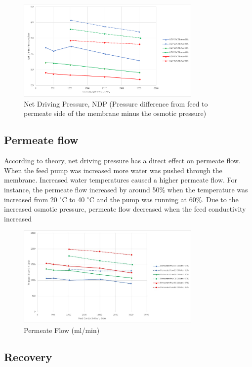 \begin{figure}[H]
    \centering
    \includegraphics[width=0.8\textwidth]{NDP}
    \caption{Net Driving Pressure, NDP (Pressure difference from feed to permeate side of the membrane minus the osmotic pressure)}
    \label{fig:NDP}
\end{figure}

\subsection{Permeate flow}

According to theory, net driving pressure has a direct effect on permeate flow. When the feed pump was increased more water was pushed through the membrane. Increased water temperatures caused a higher permeate flow. For instance, the permeate flow increased by around 50\% when the temperature was increased from 20 $^{\circ}$C to 40 $^{\circ}$C and the pump was running at 60\%. Due to the increased osmotic pressure, permeate flow decreased when the feed conductivity increased

\begin{figure}[H]
    \centering
    \includegraphics[width=0.8\textwidth]{permFlowCurrent}
    \caption{Permeate Flow (ml/min)}
    \label{fig:PermFC}
\end{figure}

\subsection{Recovery}

